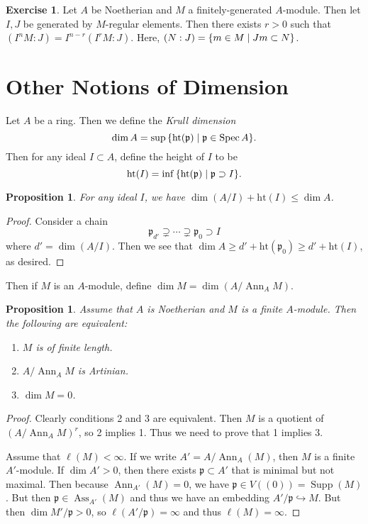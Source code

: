 \documentclass[leqno, openany]{memoir}
\newtheorem{prop}[thm]{Proposition}
\theoremstyle{definition}
\newtheorem{exer}[thm]{Exercise}
\theoremstyle{remark}
\theoremstyle{plain}
\theoremstyle{definition}
\theoremstyle{remark}
\newcommand{\mf}[1]{\mathfrak{#1}}
\newcommand{\mr}[1]{\mathrm{#1}}
\DeclareMathOperator{\Supp}{Supp}
\DeclareMathOperator{\Spec}{Spec}
\DeclareMathOperator{\Ann}{Ann}
\DeclareMathOperator{\Ass}{Ass}
\begin{document}
\begin{exer} Let $A$ be Noetherian and $M$ a finitely-generated $A$-module.
    Then let $I, J$ be generated by $M$-regular elements. Then there exists $r
    > 0$ such that $(I^n M : J) = I^{n-r} (I^r M : J)$. Here, $(N:J) = \qty{ m
    \in M \mid Jm \subset N }$.  \end{exer}

\section{Other Notions of Dimension}%

Let $A$ be a ring. Then we define the \textit{Krull dimension} \[ \dim A = \sup
    \qty{ \mr{ht}(\mf{p}) \mid \mf{p} \in \Spec A }. \] Then for any ideal $I
    \subset A$, define the height of $I$ to be \[ \mr{ht}(I) = \inf
    \qty{\mr{ht}(\mf{p}) \mid \mf{p} \supset I}. \]

\begin{prop} For any ideal $I$, we have $\dim ( A/I ) + \mr{ht}(I) \leq \dim
A$.  \end{prop}

\begin{proof} Consider a chain \[ \mf{p}_{d'} \supsetneq \cdots \supsetneq
\mf{p}_0 \supset I \] where $d' = \dim(A/I)$. Then we see that $\dim A \geq d'
+ \mr{ht}(\mf{p}_0) \geq d' + \mr{ht}(I)$, as desired.  \end{proof}

Then if $M$ is an $A$-module, define $\dim M = \dim ( A / \Ann_A M )$.

\begin{prop} Assume that $A$ is Noetherian and $M$ is a finite $A$-module. Then
the following are equivalent: \begin{enumerate} \item $M$ is of finite length.
\item $A / \Ann_A M$ is Artinian.  \item $\dim M = 0$.  \end{enumerate}
\end{prop}

\begin{proof} Clearly conditions 2 and 3 are equivalent. Then $M$ is a quotient
    of $(A/\Ann_A M)^r$, so 2 implies 1. Thus we need to prove that 1 implies
    3.

    Assume that $\ell(M) < \infty$. If we write $A' = A/\Ann_A(M)$, then $M$ is
a finite $A'$-module. If $\dim A' > 0$, then there exists $\mf{p} \subset A'$
that is minimal but not maximal. Then because $\Ann_{A'}(M) = 0$, we have
$\mf{p} \in V((0)) = \Supp(M)$. But then $\mf{p} \in \Ass_{A'}(M)$ and thus we
have an embedding $A' / \mf{p} \hookrightarrow M$. But then $\dim M' / \mf{p} >
0$, so $\ell(A' / \mf{p}) = \infty$ and thus $\ell(M) = \infty$.  \end{proof}
\end{document}
